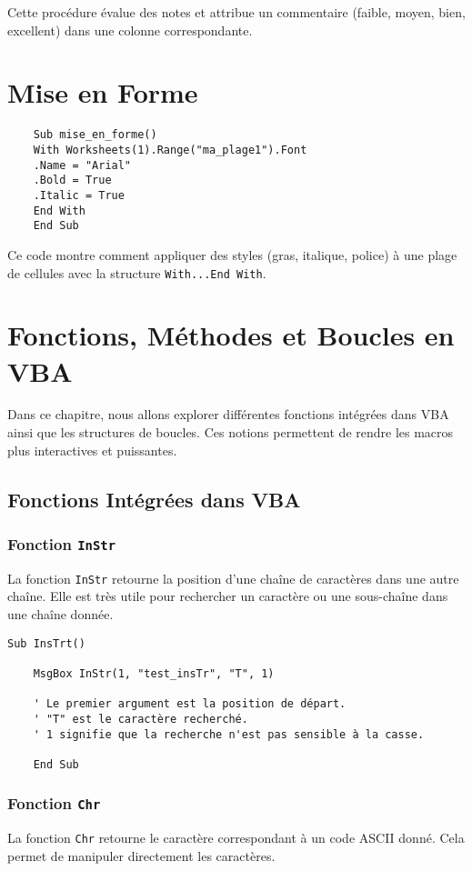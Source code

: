 \documentclass[a4paper,12pt]{report}
\begin{document}
Cette procédure évalue des notes et attribue un commentaire (faible, moyen, bien, excellent) dans une colonne correspondante.

\chapter{Mise en Forme}

\begin{lstlisting}
	Sub mise_en_forme()
	With Worksheets(1).Range("ma_plage1").Font
	.Name = "Arial"
	.Bold = True
	.Italic = True
	End With
	End Sub
\end{lstlisting}

Ce code montre comment appliquer des styles (gras, italique, police) à une plage de cellules avec la structure \texttt{With...End With}.

\chapter{Fonctions, Méthodes et Boucles en VBA}

Dans ce chapitre, nous allons explorer différentes fonctions intégrées dans VBA ainsi que les structures de boucles. Ces notions permettent de rendre les macros plus interactives et puissantes.

\section{Fonctions Intégrées dans VBA}

\subsection{Fonction \texttt{InStr}}
La fonction \texttt{InStr} retourne la position d'une chaîne de caractères dans une autre chaîne. Elle est très utile pour rechercher un caractère ou une sous-chaîne dans une chaîne donnée.

\begin{lstlisting}[caption=Exemple de fonction InStr]
	Sub InsTrt()
	
	MsgBox InStr(1, "test_insTr", "T", 1)
	
	' Le premier argument est la position de départ.
	' "T" est le caractère recherché.
	' 1 signifie que la recherche n'est pas sensible à la casse.
	
	End Sub
\end{lstlisting}

\subsection{Fonction \texttt{Chr}}
La fonction \texttt{Chr} retourne le caractère correspondant à un code ASCII donné. Cela permet de manipuler directement les caractères.
\end{document}
